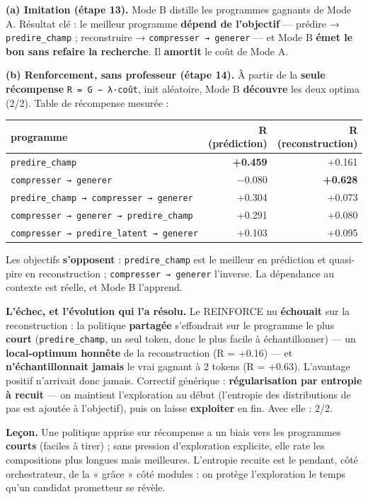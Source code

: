 \documentclass[
  french,
  11pt,
]{article}
\newcounter{none} %
\begin{document}
\textbf{(a) Imitation (étape 13).} Mode B distille les programmes
gagnants de Mode A. Résultat clé : le meilleur programme \textbf{dépend
de l'objectif} --- prédire → \texttt{predire\_champ} ; reconstruire →
\texttt{compresser\ →\ generer} --- et Mode B \textbf{émet le bon sans
refaire la recherche}. Il \textbf{amortit} le coût de Mode A.

\textbf{(b) Renforcement, sans professeur (étape 14).} À partir de la
\textbf{seule récompense} \texttt{R\ =\ G\ −\ λ·coût}, init aléatoire,
Mode B \textbf{découvre} les deux optima (2/2). Table de récompense
mesurée :

{\def\LTcaptype{none} %
\begin{longtable}[]{@{}lrr@{}}
\toprule\noalign{}
programme & R (prédiction) & R (reconstruction) \\
\midrule\noalign{}
\endhead
\bottomrule\noalign{}
\endlastfoot
\texttt{predire\_champ} & \textbf{+0.459} & +0.161 \\
\texttt{compresser\ →\ generer} & −0.080 & \textbf{+0.628} \\
\texttt{predire\_champ\ →\ compresser\ →\ generer} & +0.304 & +0.073 \\
\texttt{compresser\ →\ generer\ →\ predire\_champ} & +0.291 & +0.080 \\
\texttt{compresser\ →\ predire\_latent\ →\ generer} & +0.103 & +0.095 \\
\end{longtable}
}

Les objectifs \textbf{s'opposent} : \texttt{predire\_champ} est le
meilleur en prédiction et quasi-pire en reconstruction ;
\texttt{compresser\ →\ generer} l'inverse. La dépendance au contexte est
réelle, et Mode B l'apprend.

\textbf{L'échec, et l'évolution qui l'a résolu.} Le REINFORCE nu
\textbf{échouait} sur la reconstruction : la politique \textbf{partagée}
s'effondrait sur le programme le plus \textbf{court}
(\texttt{predire\_champ}, un seul token, donc le plus facile à
échantillonner) --- un \textbf{local-optimum honnête} de la
reconstruction (R = +0.16) --- et \textbf{n'échantillonnait jamais} le
vrai gagnant à 2 tokens (R = +0.63). L'avantage positif n'arrivait donc
jamais. Correctif générique : \textbf{régularisation par entropie à
recuit} --- on maintient l'exploration au début (l'entropie des
distributions de pas est ajoutée à l'objectif), puis on laisse
\textbf{exploiter} en fin. Avec elle : 2/2.

\textbf{Leçon.} Une politique apprise sur récompense a un biais vers les
programmes \textbf{courts} (faciles à tirer) ; sans pression
d'exploration explicite, elle rate les compositions plus longues mais
meilleures. L'entropie recuite est le pendant, côté orchestrateur, de la
« grâce » côté modules : on protège l'exploration le temps qu'un
candidat prometteur se révèle.
\end{document}
